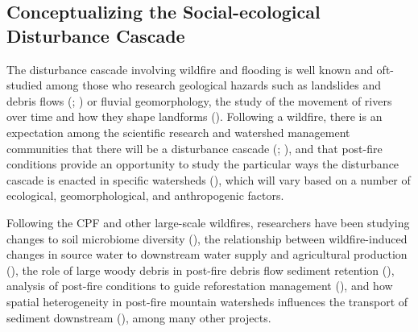 \documentclass[
]{article}
\begin{document}
\subsection{Conceptualizing the Social-ecological Disturbance Cascade}\label{conceptualizing-the-social-ecological-disturbance-cascade}

The disturbance cascade involving wildfire and flooding is well known and oft-studied among those who research geological hazards such as landslides and debris flows (; ) or fluvial geomorphology, the study of the movement of rivers over time and how they shape landforms (). Following a wildfire, there is an expectation among the scientific research and watershed management communities that there will be a disturbance cascade (; ), and that post-fire conditions provide an opportunity to study the particular ways the disturbance cascade is enacted in specific watersheds (), which will vary based on a number of ecological, geomorphological, and anthropogenic factors.

Following the CPF and other large-scale wildfires, researchers have been studying changes to soil microbiome diversity (), the relationship between wildfire-induced changes in source water to downstream water supply and agricultural production (), the role of large woody debris in post-fire debris flow sediment retention (), analysis of post-fire conditions to guide reforestation management (), and how spatial heterogeneity in post-fire mountain watersheds influences the transport of sediment downstream (), among many other projects.
\end{document}
